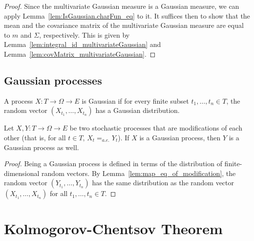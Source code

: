 \begin{proof}\leanok
Since the multivariate Gaussian measure is a Gaussian measure, we can apply Lemma~\ref{lem:IsGaussian.charFun_eq} to it.
It suffices then to show that the mean and the covariance matrix of the multivariate Gaussian measure are equal to $m$ and $\Sigma$, respectively.
This is given by Lemma~\ref{lem:integral_id_multivariateGaussian} and Lemma~\ref{lem:covMatrix_multivariateGaussian}.
\end{proof}


\section{Gaussian processes}
\label{sec:gaussian_processes}

\begin{definition}\label{def:IsGaussianProcess}
  \mathlibok
A process $X : T \to \Omega \to E$ is Gaussian if for every finite subset $t_1, \ldots, t_n \in T$, the random vector $(X_{t_1}, \ldots, X_{t_n})$ has a Gaussian distribution.
\end{definition}


\begin{lemma}\label{lem:isGaussianProcess_of_modification}
  \mathlibok
Let $X, Y : T \to \Omega \to E$ be two stochastic processes that are modifications of each other (that is, for all $t \in T$, $X_t =_{a.e.} Y_t$).
If $X$ is a Gaussian process, then $Y$ is a Gaussian process as well.
\end{lemma}

\begin{proof}\leanok
Being a Gaussian process is defined in terms of the distribution of finite-dimensional random vectors.
By Lemma~\ref{lem:map_eq_of_modification}, the random vector $(Y_{t_1}, \ldots, Y_{t_n})$ has the same distribution as the random vector $(X_{t_1}, \ldots, X_{t_n})$ for all $t_1, \ldots, t_n \in T$.
\end{proof}


\chapter{Kolmogorov-Chentsov Theorem}
\label{chap:kolmogorov_chentsov}

